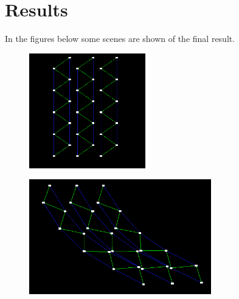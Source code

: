 \section{Results}
In the figures below some scenes are shown of the final result.

\begin{figure}[h!]
\centering
\begin{minipage}[t]{.40\textwidth}
  \centering
  \includegraphics[height=5cm]{img/resulthair.png}
  \label{fig:hair}
\end{minipage}\hfill
\begin{minipage}[t]{.50\textwidth}
  \centering
  \includegraphics[height=5cm]{img/resulthair2.png}
  \label{fig:hair2}
\end{minipage}
\end{figure}

